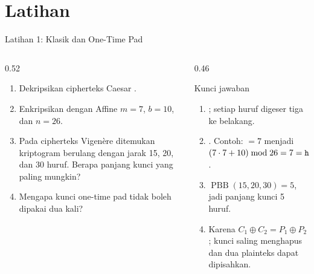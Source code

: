 \documentclass[aspectratio=169,11pt]{beamer}
\begin{document}
\section{Latihan}

\begin{frame}{Latihan 1: Klasik dan One-Time Pad}
    \scriptsize
    \begin{columns}[T,onlytextwidth]
        \begin{column}{0.52\textwidth}
            \begin{enumerate}
                \setlength{\itemsep}{4pt}
                \item Dekripsikan cipherteks Caesar .
                \item Enkripsikan  dengan Affine $m=7$, $b=10$,
                      dan $n=26$.
                \item Pada cipherteks Vigen\`ere ditemukan kriptogram berulang
                      dengan jarak 15, 20, dan 30 huruf. Berapa panjang kunci
                      yang paling mungkin?
                \item Mengapa kunci one-time pad tidak boleh dipakai dua kali?
            \end{enumerate}
        \end{column}
        \begin{column}{0.46\textwidth}
            \begin{block}{Kunci jawaban}
                \begin{enumerate}
                    \setlength{\itemsep}{3pt}
                    \item {}; setiap huruf digeser tiga
                          ke belakang.
                    \item {}. Contoh: $=7$ menjadi
                          $(7\cdot7+10)\bmod26=7=\texttt{h}$.
                    \item $\operatorname{PBB}(15,20,30)=5$, jadi panjang kunci
                          5 huruf.
                    \item Karena $C_1\oplus C_2=P_1\oplus P_2$; kunci saling
                          menghapus dan dua plainteks dapat dipisahkan.
                \end{enumerate}
            \end{block}
        \end{column}
    \end{columns}
\end{frame}
\end{document}
